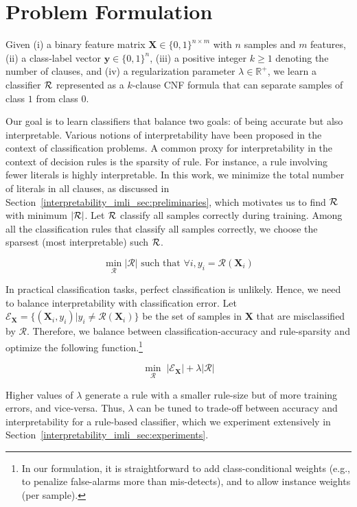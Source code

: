 

 \section{Problem Formulation}
 \label{interpretability_imli_sec:problem}
Given (i) a binary feature matrix $ \mathbf{X} \in \{0,1\}^{n \times m} $ with $ n $ samples and $ m $ features, (ii) a class-label vector $ \mathbf{y} \in \{0,1\}^n $, (iii) a positive integer $ k \ge 1 $ denoting the number of clauses, and (iv) a regularization parameter $ \lambda \in \mathbb{R}^+ $, we learn a classifier $ {\mathcal{R}} $ represented as a $ k $-clause CNF formula that can separate samples of class $ 1 $ from class $ 0 $. 
 
 

 Our goal is to learn classifiers that balance two 
 goals: of  being accurate but also interpretable.  
 Various notions of interpretability have been proposed in the context of   classification problems. A common proxy for interpretability in the context of decision rules 
 is the sparsity of rule. For instance, a rule involving fewer literals is highly interpretable.  In this work, we minimize the total number of literals in all clauses, as discussed in Section~\ref{interpretability_imli_sec:preliminaries}, which motivates us to  find $ {\mathcal{R}}  $ with minimum  $ |{\mathcal{R}}| $. Let $ {\mathcal{R}} $ classify all samples correctly during training. Among all the classification rules that classify all samples correctly,  we choose the sparsest (most interpretable) such $ {\mathcal{R}} $. 
 
 

 \[
 \min\limits_{\mathcal{R}} |\mathcal{R}|\text{ such that }\forall i, y_i=\mathcal{R}(\mathbf{X}_i)
 \]

 

 In practical classification tasks, perfect classification is unlikely. Hence, we need to balance interpretability with classification error.  Let $ \mathcal{E}_\mathbf{X} = \{(\mathbf{X}_i,y_i) | y_i \ne \mathcal{R}(\mathbf{X}_i) \} $   be  the set of samples in $ \mathbf{X} $ that are misclassified  by $ \mathcal{R} $. Therefore, we balance between classification-accuracy and rule-sparsity and optimize the following function.\footnote{In our formulation, it is  straightforward to add class-conditional weights  (e.g., to penalize  false-alarms more than mis-detects), and to allow instance weights (per sample).}

 \begin{equation}
  \label{interpretability_imli_eq:obj}
 \min\limits_{\mathcal{R}} \;  |\mathcal{E}_\mathbf{X}| +\lambda |\mathcal{R}|
 \end{equation}
 
Higher  values of $ \lambda $ generate a rule with a smaller rule-size but of more training errors, and vice-versa. Thus, $ \lambda $ can be tuned to trade-off between accuracy and interpretability for a rule-based classifier, which we experiment extensively in Section~\ref{interpretability_imli_sec:experiments}.

